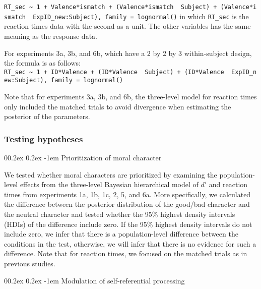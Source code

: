 \documentclass[
  man]{apa6}
\makeatletter
\let\oldparagraph\paragraph
\renewcommand{\paragraph}[1]{\oldparagraph{#1}\mbox{}}
\renewcommand{\paragraph}{\@startsection{paragraph}{4}{\parindent}%
  {0\baselineskip \@plus 0.2ex \@minus 0.2ex}%
  {-1em}%
  {\normalfont\normalsize\bfseries\itshape\typesectitle}}
\makeatother
\begin{document}
\texttt{RT\_sec\ \textasciitilde{}\ 1\ +\ Valence*ismatch\ +\ (Valence*ismatch\ \textbar{}\ Subject)\ +\ (Valence*ismatch\ \textbar{}\ ExpID\_new:Subject),\ family\ =\ lognormal()}
in which \texttt{RT\_sec} is the reaction times data with the second as a unit. The other variables has the same meaning as the response data.

For experiments 3a, 3b, and 6b, which have a 2 by 2 by 3 within-subject design, the formula is as follows:
\texttt{RT\_sec\ \textasciitilde{}\ 1\ +\ ID*Valence\ +\ (ID*Valence\ \textbar{}\ Subject)\ +\ (ID*Valence\ \textbar{}\ ExpID\_new:Subject),\ family\ =\ lognormal()}

Note that for experiments 3a, 3b, and 6b, the three-level model for reaction times only included the matched trials to avoid divergence when estimating the posterior of the parameters.

\hypertarget{testing-hypotheses}{%
\subsubsection{Testing hypotheses}\label{testing-hypotheses}}

\hypertarget{prioritization-of-moral-character}{%
\paragraph{Prioritization of moral character}\label{prioritization-of-moral-character}}

We tested whether moral characters are prioritized by examining the population-level effects from the three-level Bayesian hierarchical model of \(d'\) and reaction times from experiments 1a, 1b, 1c, 2, 5, and 6a. More specifically, we calculated the difference between the posterior distribution of the good/bad character and the neutral character and tested whether the 95\% highest density intervals (HDIs) of the difference include zero. If the 95\% highest density intervals do not include zero, we infer that there is a population-level difference between the conditions in the test, otherwise, we will infer that there is no evidence for such a difference. Note that for reaction times, we focused on the matched trials as in previous studies.

\hypertarget{modulation-of-self-referential-processing}{%
\paragraph{Modulation of self-referential processing}\label{modulation-of-self-referential-processing}}
\end{document}
